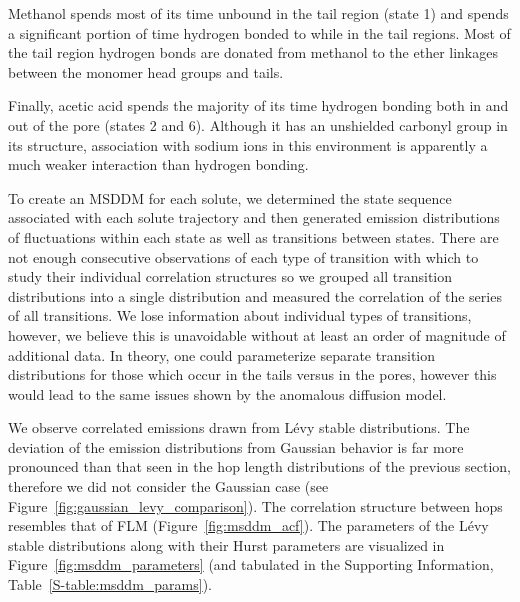 \documentclass{article}
\begin{document}
  Methanol spends most of its time unbound in the tail region (state 1) and spends a 
  significant portion of time hydrogen bonded to while in the tail regions.
  Most of the tail region hydrogen bonds are donated from methanol to the ether
  linkages between the monomer head groups and tails.
  
  Finally, acetic acid spends the majority of its time hydrogen bonding both in and out
  of the pore (states 2 and 6). Although it has an unshielded carbonyl group in its
  structure, association with sodium ions in this environment is apparently a much 
  weaker interaction than hydrogen bonding.
  
  To create an MSDDM for each solute, we determined the state sequence associated
  with each solute trajectory and then generated emission distributions of fluctuations
  within each state as well as transitions between states. There are not enough 
  consecutive observations of each type of transition with which to study their 
  individual correlation structures so we grouped all transition distributions
  into a single distribution and measured the correlation of the series of all 
  transitions. We lose information about individual types of transitions, however, 
  we believe this is unavoidable without at least an order of magnitude of additional data.
  In theory, one could parameterize separate transition distributions for those
  which occur in the tails versus in the pores, however this would lead to the same
  issues shown by the anomalous diffusion model.
  
  We observe correlated emissions drawn from L\'evy stable distributions. The 
  deviation of the emission distributions from Gaussian behavior is far more pronounced
  than that seen in the hop length distributions of the previous section, therefore we 
  did not consider the Gaussian case (see Figure~\ref{fig:gaussian_levy_comparison}).
  The correlation structure between hops resembles that of FLM (Figure~\ref{fig:msddm_acf}).
  The parameters of the L\'evy stable distributions along with their Hurst parameters 
  are visualized in Figure~\ref{fig:msddm_parameters} (and tabulated in the Supporting
  Information, Table~\ref{S-table:msddm_params}). 
  
\end{document}
